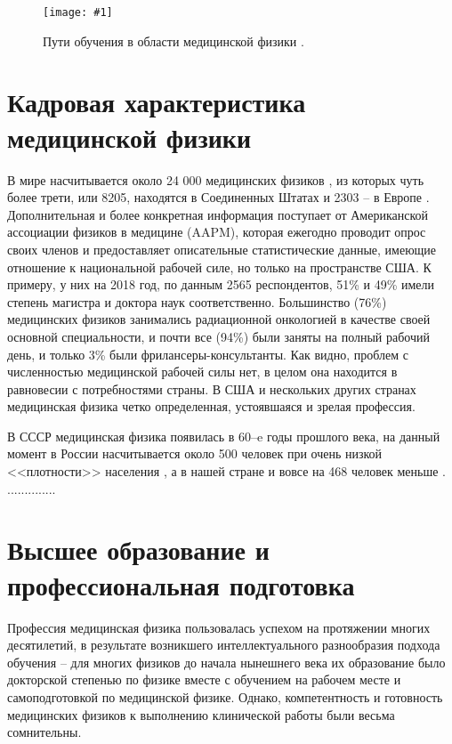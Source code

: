 \documentclass[a4paper,10pt]{extarticle}
\newcommand{\addimg}[4]{ %
    \begin{figure}
        \centering
        \texttt{[image: \#1]}
        \caption{#3} \label{#4}
    \end{figure}
}
\begin{document}
\addimg{edpath}{1}{Пути обучения в области медицинской физики \cite{Silverstein}.}{edpath}



\section{Кадровая характеристика медицинской физики}

В мире насчитывается около 24 000 медицинских физиков \cite{IOMP}, из которых чуть более трети, или 8205, находятся в Соединенных Штатах \cite{AAPM1} и 2303 -- в Европе \cite{Lievens}. Дополнительная и более конкретная информация поступает от Американской ассоциации физиков в медицине (AAPM), которая ежегодно проводит опрос своих членов и предоставляет описательные статистические данные, имеющие отношение к национальной рабочей силе, но только на пространстве США. К примеру, у них на 2018 год, по данным 2565 респондентов, 51\% и 49\% имели степень магистра и доктора наук соответственно. Большинство (76\%)  медицинских физиков занимались радиационной онкологией в качестве своей основной специальности, и почти все (94\%) были заняты на полный рабочий день, и только 3\% были фрилансеры-консультанты. Как видно, проблем с численностью медицинской рабочей силы нет, в целом она находится в равновесии с потребностями страны. В США и нескольких других странах медицинская физика четко определенная, устоявшаяся и зрелая профессия. 

В СССР медицинская физика появилась в 60--e годы прошлого века, на данный момент в России насчитывается около 500 человек при очень низкой <<плотности>> населения \cite{Костылёв}, а в нашей стране и вовсе на 468 человек меньше \cite{Тарутин}. ..............





\section{Высшее образование и профессиональная подготовка}
Профессия медицинская физика пользовалась успехом на протяжении многих десятилетий, в результате возникшего интеллектуального разнообразия подхода обучения -- для многих физиков до начала нынешнего века их образование было докторской степенью по физике вместе с обучением на рабочем месте и самоподготовкой по медицинской физике.  Однако, компетентность и готовность медицинских физиков к выполнению клинической работы были весьма сомнительны. 
\end{document}
